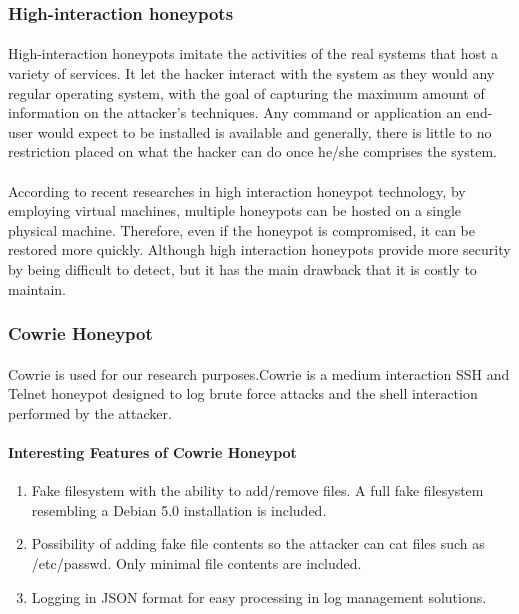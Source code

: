 \documentclass{report}
\begin{document}
\subsubsection{High-interaction honeypots}
\paragraph{}
High-interaction honeypots imitate the activities of the real systems that host a variety of services. It let the hacker interact with the system as they would any regular operating system, with the goal of capturing the maximum amount of information on the attacker’s techniques. Any command or application an end-user would expect to be installed is available and generally, there is little to no restriction placed on what the hacker can do once he/she comprises the system.
\paragraph{}
According to recent researches in high interaction honeypot technology, by employing virtual machines, multiple honeypots can be hosted on a single physical machine. Therefore, even if the honeypot is compromised, it can be restored more quickly. Although high interaction honeypots provide more security by being difficult to detect, but it has the main drawback that it is costly to maintain.

\subsubsection{Cowrie Honeypot}
\paragraph{}
Cowrie is used for our research purposes.Cowrie is a medium interaction SSH and Telnet honeypot designed to log brute force attacks and the shell interaction performed by the attacker.
\paragraph{Interesting Features of Cowrie Honeypot}

\begin{enumerate}
\item Fake filesystem with the ability to add/remove files. A full fake filesystem resembling a Debian 5.0 installation is included.
\item Possibility of adding fake file contents so the attacker can cat files such as /etc/passwd. Only minimal file contents are included.
\item Logging in JSON format for easy processing in log management solutions.
\end{enumerate}
\end{document}
